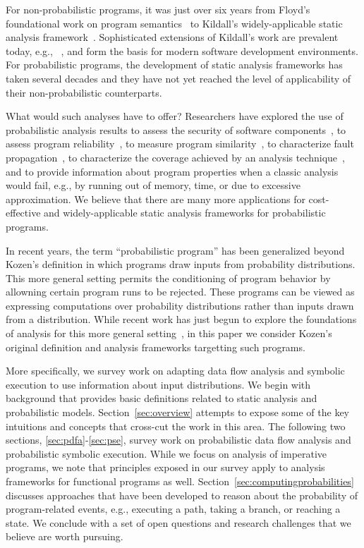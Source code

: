 For non-probabilistic programs, it was just over six years
from Floyd's foundational work on program semantics~\cite{FLOYD67} 
to Kildall's widely-applicable static analysis framework~\cite{kildall1973unified}.
Sophisticated extensions of Kildall's work are prevalent 
today, e.g., ~\cite{lam11:_soot_java,Lattner:2004:LLVM}, and form 
the basis for modern software development environments.
For probabilistic programs, the development of 
static analysis frameworks has taken several decades and 
they have not yet reached the level of applicability of 
their non-probabilistic counterparts.

What would such analyses have to offer?
Researchers have explored the use of probabilistic analysis
results to assess the security of software components~\cite{mardziel2013dynamic},
to assess program reliability~\cite{Filieri2013}, to measure program
similarity~\cite{Geldenhuys2012}, 
to characterize fault propagation~\cite{RiskAwareTransformation},
to characterize the coverage
achieved by an analysis technique~\cite{DwyerASE11}, and to provide information
about program properties when a classic analysis would fail, e.g.,
by running out of memory, time, or due to excessive approximation.
We believe that there are many more applications for cost-effective
and widely-applicable static analysis frameworks for probabilistic
programs.

In recent years, the term ``probabilistic program'' has been generalized 
beyond Kozen's definition in which programs draw inputs from probability 
distributions.
This more general setting permits the conditioning of program behavior by
allowning certain program runs to be rejected.  
These programs can be viewed as expressing computations over 
probability distributions rather than inputs drawn from a distribution.  
While recent work has just begun to explore the foundations of analysis for
this more general setting~\cite{Gordon2014}, in this paper we consider
Kozen's original definition and analysis frameworks targetting such programs.

More specifically, we survey work on adapting data flow analysis 
and symbolic execution to use information about input distributions.
We begin with background that provides basic definitions
related to static analysis and probabilistic models.
Section~\ref{sec:overview} attempts to expose some of the key
intuitions and concepts that cross-cut the work in this area.
The following two sections, \ref{sec:pdfa}-\ref{sec:pse}, 
survey work on probabilistic data flow analysis and probabilistic
symbolic execution.  
While we focus on analysis of imperative programs, we note that
principles exposed in our survey apply to analysis frameworks 
for functional programs as well.
Section~\ref{sec:computingprobabilities} discusses approaches that
have been developed to reason about the probability of program-related 
events, e.g., executing a path, taking a branch, or reaching a state.
We conclude with a set of open questions
and research challenges that we believe are worth pursuing.

